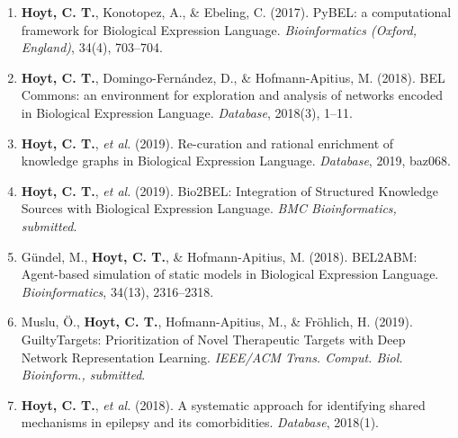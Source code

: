 \begin{enumerate}
    \item \textbf{Hoyt, C. T.}, Konotopez, A., \& Ebeling, C. (2017). PyBEL: a computational framework for Biological Expression Language. \textit{Bioinformatics (Oxford, England)}, 34(4), 703–704.
    \item \textbf{Hoyt, C. T.}, Domingo-Fern\'{a}ndez, D., \& Hofmann-Apitius, M. (2018). BEL Commons: an environment for exploration and analysis of networks encoded in Biological Expression Language. \textit{Database}, 2018(3), 1–11.
    \item \textbf{Hoyt, C. T.}, \textit{et al.} (2019). Re-curation and rational enrichment of knowledge graphs in Biological Expression Language. \textit{Database}, 2019, baz068.
    \item \textbf{Hoyt, C. T.}, \textit{et al.} (2019). Bio2BEL: Integration of Structured Knowledge Sources with Biological Expression Language. \textit{BMC Bioinformatics, submitted}.
    \item Gündel, M., \textbf{Hoyt, C. T.}, \& Hofmann-Apitius, M. (2018). BEL2ABM: Agent-based simulation of static models in Biological Expression Language. \textit{Bioinformatics}, 34(13), 2316–2318.
    \item Muslu, Ö., \textbf{Hoyt, C. T.}, Hofmann-Apitius, M., \& Fröhlich, H. (2019). GuiltyTargets: Prioritization of Novel Therapeutic Targets with Deep Network Representation Learning. \textit{IEEE/ACM Trans. Comput. Biol. Bioinform., submitted}.
    \item \textbf{Hoyt, C. T.}, \textit{et al.} (2018). A systematic approach for identifying shared mechanisms in epilepsy and its comorbidities. \textit{Database}, 2018(1).
\end{enumerate}
